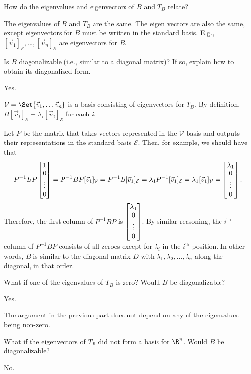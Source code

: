 	\begin{parts}
		\item How do the eigenvalues and eigenvectors of $B$ and $T_B$ relate?
		\begin{solution}
			The eigenvalues of $B$ and $T_B$ are the same. The eigen vectors
			are also the same, except eigenvectors for $B$ must be written
			in the standard basis. E.g., $[\vec v_1]_{\mathcal E},\ldots,[\vec v_n]_{\mathcal E}$
			are eigenvectors for $B$.
		\end{solution}
		\item Is $B$ diagonalizable (i.e., similar to a diagonal matrix)?  If so, explain how to obtain its diagonalized form.
		\begin{solution}
			Yes. 

			$\mathcal V=\Set{\vec v_1,\ldots \vec v_n}$ is a basis consisting
			of eigenvectors for $T_B$. By definition, $B[\vec v_i]_{\mathcal E}=\lambda_i[\vec v_i]_{\mathcal E}$
			for each $i$. 

			Let $P$ be the matrix that takes vectors represented in the
			$\mathcal V$ basis and outputs their representations in the standard
			basis $\mathcal E$. Then, for example, we should have that
			\[
				P^{-1}BP\begin{bmatrix}1\\0\\\vdots\\0\end{bmatrix}
				=P^{-1}BP[\vec v_1]_{\mathcal V}
				=P^{-1}B[\vec v_1]_{\mathcal E}
				=\lambda_1P^{-1}[\vec v_1]_{\mathcal E}
				=\lambda_1[\vec v_1]_{\mathcal V}
				=\begin{bmatrix}\lambda_1\\0\\\vdots\\0\end{bmatrix}.
			\]
			Therefore, the first column of $P^{-1}BP$ is $\begin{bmatrix}\lambda_1\\0\\\vdots\\0\end{bmatrix}$.
			By similar reasoning, the $i^\text{th}$ column of $P^{-1}BP$ consists
			of all zeroes except for $\lambda_i$ in the $i^\text{th}$ position. 
			In other words, $B$ is similar to the diagonal matrix $D$ with 
			$\lambda_1, \lambda_2, \dots, \lambda_n$ along the diagonal, in that
			order. 
		\end{solution}
		\item What if one of the eigenvalues of $T_B$ is zero?  Would $B$ be diagonalizable?
			\begin{solution}
				Yes. 

				The argument in the previous part does not depend on any of the
				eigenvalues being non-zero.
			\end{solution}
		\item What if the eigenvectors of $T_B$ did not form a basis for $\R^n$.
			Would $B$ be diagonalizable?
			\begin{solution}
				No. 


\end{solution}
\end{parts}
